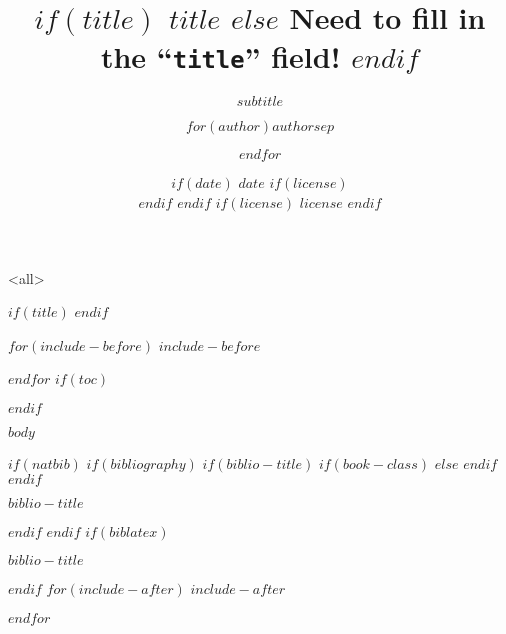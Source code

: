 \documentclass[$if(fontsize)$$fontsize$,$endif$$if(lang)$$babel-lang$,$endif$$if(handout)$handout,$endif$$if(beamer)$ignorenonframetext,$endif$$for(classoption)$$classoption$$sep$,$endfor$]{$documentclass$}
\subtitle{$subtitle$}
\author[
$if(short-author)$
$for(short-author)$$short-author$$sep$ \and $endfor$
$else$
$for(author)$$author$$sep$ \and $endfor$
$endif$
]{$for(author)$$author$$sep$ \and $endfor$}
\institute[
$if(short-institute)$
$for(short-institute)$$short-institute$$sep$ \and $endfor$
$endif$
]{
$if(department)$
$for(department)$$department$$sep$ \and $endfor$ \\
$endif$
$for(institute)$$institute$$sep$ \and $endfor$
$if(email)$
\\ $for(email)$ \href{mailto:$email$}{\nolinkurl{$email$}}$sep$ \and $endfor$
$endif$
}
\date[
$if(short-date)$
$short-date$
$else$
$date$
$endif$]{
$if(date)$
$date$
$if(license)$
\\ \vspace{5mm}
$endif$
$endif$
$if(license)$
{\scriptsize $license$}
$endif$
}
\newif\ifbibliography
\begin{document}
\mode<all>{
\title[
$if(short-title)$
$short-title$
$else$
Missing ``\texttt{short-title}'' field!
$endif$
]{
$if(title)$
$title$
$else$
Need to fill in the ``\texttt{title}'' field!
$endif$
}
}
\mode*

$if(title)$
\frame{\titlepage}
$endif$

$for(include-before)$
$include-before$

$endfor$
$if(toc)$
\begin{frame}
\tableofcontents[hideallsubsections]
\end{frame}
$endif$

$body$

$if(natbib)$
$if(bibliography)$
$if(biblio-title)$
$if(book-class)$
\renewcommand\bibname{$biblio-title$}
$else$
\renewcommand\refname{$biblio-title$}
$endif$
$endif$
\begin{frame}[allowframebreaks]{$biblio-title$}
\bibliographytrue

\end{frame}

$endif$
$endif$
$if(biblatex)$
\begin{frame}[allowframebreaks]{$biblio-title$}
\bibliographytrue
\printbibliography[heading=none]
\end{frame}

$endif$
$for(include-after)$
$include-after$

$endfor$
\end{document}
